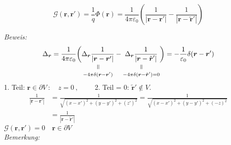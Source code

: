 \documentclass[titlepage,11pt,a4paper,ngerman]{report}
\newcommand{\verteq}{\rotatebox{90}{$\,=$}}
\newcommand{\equalto}[2]{\underset{\scriptstyle\overset{\mkern4mu\verteq}{#2}}{#1}}
\newcommand{\gre}{\mathcal{G}}
\renewcommand{\Phi}{\varPhi}
\newcommand{\kq}{\frac{1}{4\pi\epsilon_0}}
\renewcommand{\vec}[1]{\boldsymbol{#1}}
\renewcommand{\epsilon}{\varepsilon}
\newcommand{\rbox}[1]{\begin{tcolorbox}[colback=white,colframe=red!75!black]#1\end{tcolorbox}}
\begin{document}
\rbox{\begin{equation*}
\gre(\vec{r},\vec{r}') = \frac{1}{q} \Phi(\vec{r}) = \kq \left(\frac{1}{|\vec{r} - \vec{r}'|} - \frac{1}{|\vec{r} - \tilde{\vec{r}}'|}\right)
\end{equation*}}
\emph{Beweis:}
\begin{equation*}
\Delta_{\vec{r}} = \kq \bigg(\equalto{\Delta_{\vec{r}} \frac{1}{|\vec{r} - \vec{r}'|}}{- 4 \pi \delta(\vec{r} - \vec{r}')} - \equalto{\Delta_{\vec{r}} \frac{1}{|\vec{r} - \tilde{\vec{r}}'|}}{- 4 \pi \delta(\vec{r} - \tilde{\vec{r}}') = 0 }\bigg) = - \frac{1}{\epsilon_0} \delta(\vec{r} - \vec{r}')
\end{equation*}
1. Teil: $ \vec{r} \in \partial V \ : \quad z = 0 \ ,\qquad$ 2. Teil = 0: $ \tilde{\vec{r}}' \notin V $.
\begin{align*}
\frac{1}{|\vec{r} - \vec{r}'|} &= \frac{1}{\sqrt{(x-x')^2 + (y - y')^2 + (z')^2}} = \frac{1}{\sqrt{(x-x')^2 + (y-y')^2 + (-z)^2}}\\
&= \frac{1}{|\vec{r} - \tilde{\vec{r}}'|}
\end{align*}
$ \gre(\vec{r},\vec{r}') = 0 \quad \vec{r} \in \partial V $\\[5pt]
\emph{Bemerkung:}
\end{document}
